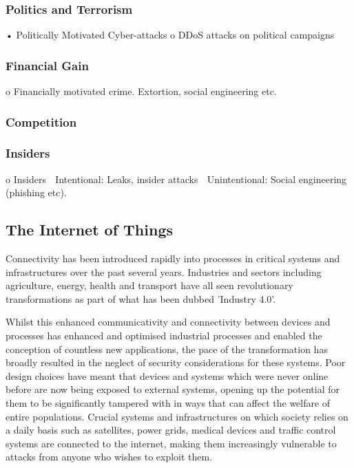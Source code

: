 		\subsubsection{Politics and Terrorism}
		•	Politically Motivated Cyber-attacks
		o	DDoS attacks on political campaigns
		
		\subsubsection{Financial Gain}
		o	Financially motivated crime. Extortion, social engineering etc.
		
		\subsubsection{Competition}
		
		\subsubsection{Insiders}
		o	Insiders
			Intentional: Leaks, insider attacks
			Unintentional: Social engineering (phishing etc).

	\subsection{The Internet of Things}
	
	Connectivity has been introduced rapidly into processes in critical systems and infrastructures over the past several years. Industries and sectors including agriculture, energy, health and transport have all seen revolutionary transformations as part of what has been dubbed 'Industry 4.0'. 
	
	Whilst this enhanced communicativity and connectivity between devices and processes has enhanced and optimised industrial processes and enabled the conception of countless new applications, the pace of the transformation has broadly resulted in the neglect of security considerations for these systems. Poor design choices have meant that devices and systems which were never online before are now being exposed to external systems, opening up the potential for them to be significantly tampered with in ways that can affect the welfare of entire populations.  Crucial systems and infrastructures on which society relies on a daily basis such as satellites, power grids, medical devices and traffic control systems are connected to the internet, making them increasingly vulnerable to attacks from anyone who wishes to exploit them.
	
